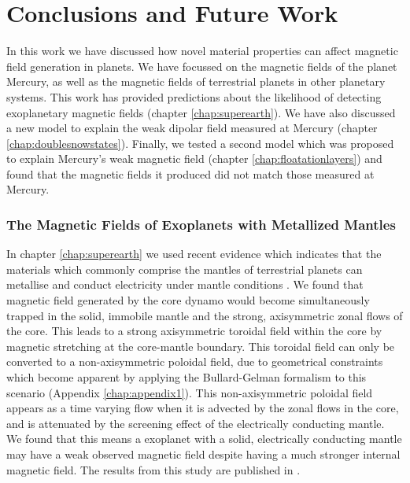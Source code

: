 
\chapter{Conclusions and Future Work}
\label{chap:conclusion}
In this work we have discussed how novel material properties can affect magnetic field generation in planets. We have focussed on the magnetic fields of the planet Mercury, as well as the magnetic fields of terrestrial planets in other planetary systems. This work has provided predictions about the likelihood of detecting exoplanetary magnetic fields (chapter \ref{chap:superearth}). We have also discussed a new model to explain the weak dipolar field measured at Mercury (chapter \ref{chap:doublesnowstates}). Finally, we tested a second model which was proposed \citep{smith2012, hauck2013} to explain Mercury's weak magnetic field (chapter \ref{chap:floatationlayers}) and found that the magnetic fields it produced did not match those measured at Mercury.

\subsection{The Magnetic Fields of Exoplanets with Metallized Mantles}
In chapter \ref{chap:superearth} we used recent evidence which indicates that the materials which commonly comprise the mantles of terrestrial planets can metallise and conduct electricity under mantle conditions \citep{nellis2010, tsuchiya2011, ohta2012}. We found that magnetic field generated by the core dynamo would become simultaneously trapped in the solid, immobile mantle and the strong, axisymmetric zonal flows of the core. This leads to a strong axisymmetric toroidal field within the core by magnetic stretching at the core-mantle boundary. This toroidal field can only be converted to a non-axisymmetric poloidal field, due to geometrical constraints which become apparent by applying the Bullard-Gelman formalism to this scenario (Appendix \ref{chap:appendix1}). This non-axisymmetric poloidal field appears as a time varying flow when it is advected by the zonal flows in the core, and is attenuated by the screening effect of the electrically conducting mantle. We found that this means a exoplanet with a solid, electrically conducting mantle may have a weak observed magnetic field despite having a much stronger internal magnetic field. The results from this study are published in \citet{vilim2013}.
 
